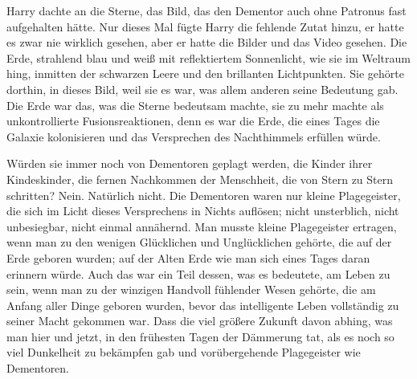 Harry dachte an die Sterne, das Bild, das den Dementor auch ohne Patronus fast aufgehalten hätte. Nur dieses Mal fügte Harry die fehlende Zutat hinzu, er hatte es zwar nie wirklich gesehen, aber er hatte die Bilder und das Video gesehen. Die Erde, strahlend blau und weiß mit reflektiertem Sonnenlicht, wie sie im Weltraum hing, inmitten der schwarzen Leere und den brillanten Lichtpunkten. Sie gehörte dorthin, in dieses Bild, weil sie es war, was allem anderen seine Bedeutung gab. Die Erde war das, was die Sterne bedeutsam machte, sie zu mehr machte als unkontrollierte Fusionsreaktionen, denn es war die Erde, die eines Tages die Galaxie kolonisieren und das Versprechen des Nachthimmels erfüllen würde.

Würden sie immer noch von Dementoren geplagt werden, die Kinder ihrer Kindeskinder, die fernen Nachkommen der Menschheit, die von Stern zu Stern schritten? Nein. Natürlich nicht. Die Dementoren waren nur kleine Plagegeister, die sich im Licht dieses Versprechens in Nichts auflösen; nicht unsterblich, nicht unbesiegbar, nicht einmal annähernd. Man musste kleine Plagegeister ertragen, wenn man zu den wenigen Glücklichen und Unglücklichen gehörte, die auf der Erde geboren wurden; auf der Alten Erde wie man sich eines Tages daran erinnern würde. Auch das war ein Teil dessen, was es bedeutete, am Leben zu sein, wenn man zu der winzigen Handvoll fühlender Wesen gehörte, die am Anfang aller Dinge geboren wurden, bevor das intelligente Leben vollständig zu seiner Macht gekommen war. Dass die viel größere Zukunft davon abhing, was man hier und jetzt, in den frühesten Tagen der Dämmerung tat, als es noch so viel Dunkelheit zu bekämpfen gab und vorübergehende Plagegeister wie Dementoren.

